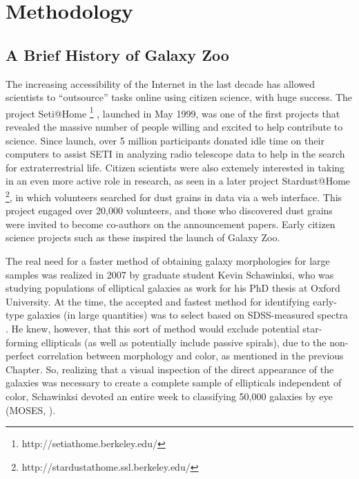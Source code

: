 \chapter{Methodology}
\label{chap:methodology}

\section{A Brief History of Galaxy Zoo}

The increasing accessibility of the Internet in the last decade has allowed scientists to ``outsource'' tasks online using citizen science, with huge success. The project Seti@Home \footnote{http://setiathome.berkeley.edu/} \citep{Anderson2002}, launched in May 1999, was one of the first projects that revealed the massive number of people willing and excited to help contribute to science. Since launch, over 5 million participants donated idle time on their computers to assist SETI in analyzing radio telescope data to help in the search for extraterrestrial life. Citizen scientists were also extemely interested in taking in an even more active role in research, as seen in a later project Stardust@Home \footnote{http://stardustathome.ssl.berkeley.edu/}, in which volunteers searched for dust grains in data via a web interface. This project engaged over 20,000 volunteers, and those who discovered dust grains were invited to become co-authors on the announcement papers. Early citizen science projects such as these inspired the launch of Galaxy Zoo.

The real need for a faster method of obtaining galaxy morphologies for large samples was realized in 2007 by graduate student Kevin Schawinksi, who was studying populations of elliptical galaxies as work for his PhD thesis at Oxford University. At the time, the accepted and fastest method for identifying early-type galaxies (in large quantities) was to select based on SDSS-measured spectra \citep{Bernardi2003}. He knew, however, that this sort of method would exclude potential star-forming ellipticals (as well as potentially include passive spirals), due to the non-perfect correlation between morphology and color, as mentioned in the previous Chapter. So, realizing that a visual inspection of the direct appearance of the galaxies was necessary to create a complete sample of ellipticals independent of color, Schawinksi devoted an entire week to classifying 50,000 galaxies by eye (MOSES, \citet{Schawinksi2007}). 

